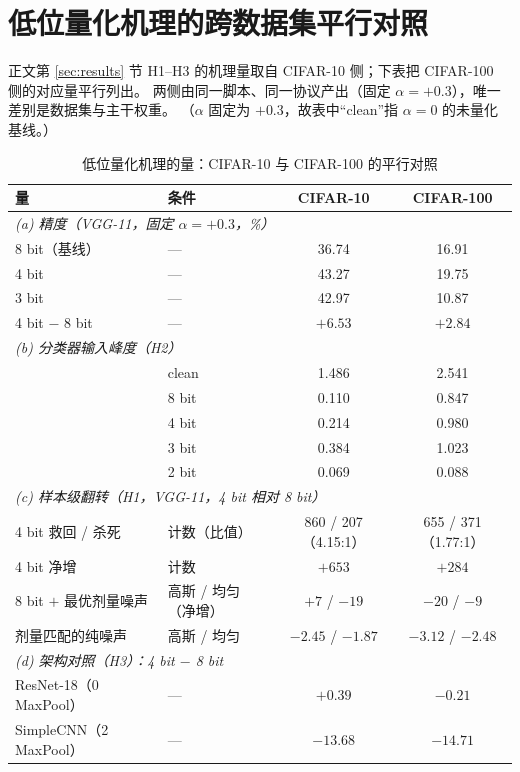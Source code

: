 \documentclass[11pt,a4paper]{ctexart}
\begin{document}
\clearpage   %
\section{低位量化机理的跨数据集平行对照}
\label{app:dither-c100}

正文第 \ref{sec:results} 节 H1--H3 的机理量取自 CIFAR-10 侧；下表把 CIFAR-100 侧的对应量平行列出。
两侧由同一脚本、同一协议产出（固定 $\alpha=+0.3$），唯一差别是数据集与主干权重。
（$\alpha$ 固定为 $+0.3$，故表中“clean”指 $\alpha=0$ 的未量化基线。）

\begin{table}[h]
\centering
\caption{低位量化机理的量：CIFAR-10 与 CIFAR-100 的平行对照}
\label{tab:dither-c100}
\small
\setlength{\tabcolsep}{5pt}
\begin{tabular}{llcc}
\toprule
量 & 条件 & CIFAR-10 & CIFAR-100 \\
\midrule
\multicolumn{4}{l}{\emph{(a) 精度（VGG-11，固定 $\alpha=+0.3$，\%）}} \\
8 bit（基线） & --- & 36.74 & 16.91 \\
4 bit & --- & 43.27 & 19.75 \\
3 bit & --- & 42.97 & 10.87 \\
\midrule
4 bit $-$ 8 bit & --- & $+6.53$ & $+2.84$ \\
\midrule
\multicolumn{4}{l}{\emph{(b) 分类器输入峰度（H2）}} \\
 & clean & 1.486 & 2.541 \\
 & 8 bit & 0.110 & 0.847 \\
 & 4 bit & 0.214 & 0.980 \\
 & 3 bit & 0.384 & 1.023 \\
 & 2 bit & 0.069 & 0.088 \\
\midrule
\multicolumn{4}{l}{\emph{(c) 样本级翻转（H1，VGG-11，4 bit 相对 8 bit）}} \\
4 bit 救回 / 杀死 & 计数（比值） & 860 / 207（4.15:1） & 655 / 371（1.77:1） \\
4 bit 净增 & 计数 & $+653$ & $+284$ \\
8 bit $+$ 最优剂量噪声 & 高斯 / 均匀（净增） & $+7$ / $-19$ & $-20$ / $-9$ \\
剂量匹配的纯噪声 & 高斯 / 均匀 & $-2.45$ / $-1.87$ & $-3.12$ / $-2.48$ \\
\midrule
\multicolumn{4}{l}{\emph{(d) 架构对照（H3）：4 bit $-$ 8 bit}} \\
ResNet-18（0 MaxPool） & --- & $+0.39$ & $-0.21$ \\
SimpleCNN（2 MaxPool） & --- & $-13.68$ & $-14.71$ \\
\bottomrule
\end{tabular}
\end{table}
\end{document}

